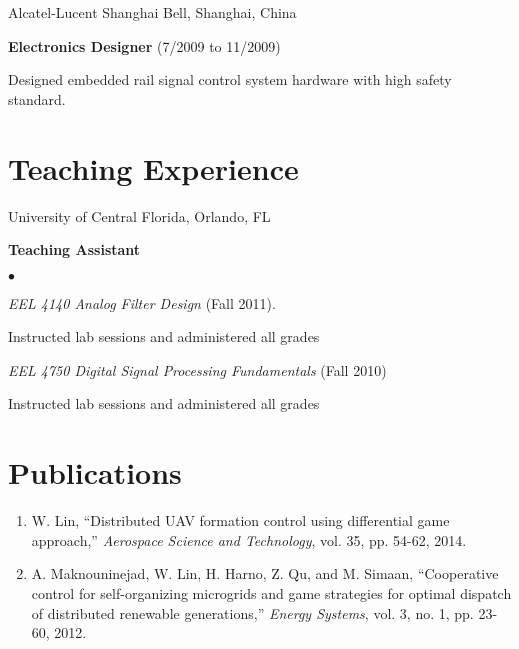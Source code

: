\documentclass[margin,line]{res}
\newenvironment{list1}{
  \begin{list}{\ding{113}}{%
      \setlength{\itemsep}{0in}
      \setlength{\parsep}{0in} \setlength{\parskip}{0in}
      \setlength{\topsep}{0in} \setlength{\partopsep}{0in} 
      \setlength{\leftmargin}{0.17in}}}{\end{list}}
\newenvironment{list2}{
  \begin{list}{$\bullet$}{%
      \setlength{\itemsep}{0in}
      \setlength{\parsep}{0in} \setlength{\parskip}{0in}
      \setlength{\topsep}{0in} \setlength{\partopsep}{0in} 
      \setlength{\leftmargin}{0.2in}}}{\end{list}}
\begin{document}
\begin{resume}
\begin{list1}
\item[] Alcatel-Lucent Shanghai Bell, Shanghai, China
\vspace*{.05in}
\begin{list1}
\item[] \textbf{Electronics Designer} (7/2009 to 11/2009)
\item[] Designed embedded rail signal control system hardware with high safety standard. 
\end{list1}

\end{list1}


\section{\sc Teaching Experience}
\begin{list1}
\item[] University of Central Florida, Orlando, FL
\vspace*{.05in}
\begin{list1}
\item[] \textbf{Teaching Assistant}
\begin{list2}
\item[] \textit{EEL 4140 Analog Filter Design} (Fall 2011).
\item[] Instructed lab sessions and administered all grades
\item[] \textit{EEL 4750 Digital Signal Processing Fundamentals} (Fall 2010)
\item[] Instructed lab sessions and administered all grades
\end{list2}
\end{list1}
\end{list1}


\section{\sc Publications}
\begin{enumerate}
\item W. Lin, ``Distributed UAV formation control using differential game approach,'' \emph{Aerospace Science and Technology}, vol. 35, pp. 54-62, 2014.
\vspace*{0.3cm}

\item A. Maknouninejad, W. Lin, H. Harno, Z. Qu, and M. Simaan, ``Cooperative control for self-organizing microgrids and game strategies for optimal dispatch of distributed renewable generations,'' \emph{Energy Systems}, vol. 3, no. 1, pp. 23-60, 2012.
\vspace*{0.3cm}


\end{enumerate}
\end{resume}
\end{document}
